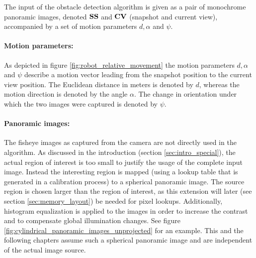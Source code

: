 The input of the obstacle detection algorithm is given as a pair of monochrome panoramic images, denoted $\mathbf{SS}$ and $\mathbf{CV}$ (snapshot and current view), accompanied by a set of motion parameters $d, \alpha$ and $\psi$.

\paragraph{Motion parameters:} As depicted in figure \ref{fig:robot_relative_movement} the motion parameters $d, \alpha$ and $\psi$ describe a motion vector leading from the snapshot position to the current view position. The Euclidean distance in meters is denoted by $d$, whereas the motion direction is denoted by the angle $\alpha$. The change in orientation under which the two images were captured is denoted by $\psi$.

\paragraph{Panoramic images:}
\label{sec:panoramic_image}
The fisheye images as captured from the camera are not directly used in the algorithm. As discussed in the introduction (section \ref{sec:intro_special}), the actual region of interest is too small to justify the usage of the complete input image. Instead the interesting region is mapped (using a lookup table that is generated in a calibration process) to a spherical panoramic image. The source region is chosen larger than the region of interest, as this extension will later (see section \ref{sec:memory_layout}) be needed for pixel lookups. Additionally, histogram equalization is applied to the images in order to increase the contrast and to compensate global illumination changes. See figure \ref{fig:cylindrical_panoramic_images_unprojected} for an example. This and the following chapters assume such a spherical panoramic image and are independent of the actual image source.

